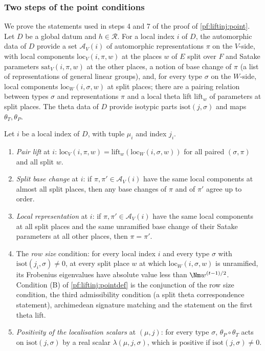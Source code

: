 \subsubsection{Two steps of the point conditions}\label{sec:pf:liftinj:ptsteps}

We prove the statements used in steps 4 and 7 of the proof of \cref{pf:liftinj:point}. Let $D$ be a global datum and $h\in\mathcal R$. For a local index
$i$ of $D$, the automorphic data of $D$ provide a set $\mathcal A_V(i)$ of automorphic representations $\pi$ on the $V$-side, with local components
$\mathrm{loc}_V(i,\pi,w)$ at the places $w$ of $E$ split over $F$ and Satake parameters $\mathrm{sat}_V(i,\pi,w)$ at the other places, a notion of base
change of $\pi$ (a list of representations of general linear groups), and, for every type $\sigma$ on the $W$-side, local components
$\mathrm{loc}_W(i,\sigma,w)$ at split places; there are a pairing relation between types $\sigma$ and representations $\pi$ and a local theta lift
$\mathrm{lift}_w$ of parameters at split places. The theta data of $D$ provide isotypic parts $\mathrm{isot}(j,\sigma)$ and maps $\theta_T,\theta_P$.

\begin{definition}\label{pf:liftinj:rowdef}
Let $i$ be a local index of $D$, with tuple $\mu_i$ and index $j_i$.
\begin{enumerate}[label=(\alph*)]
\item \emph{Pair lift} at $i$: $\mathrm{loc}_V(i,\pi,w)=\mathrm{lift}_w(\mathrm{loc}_W(i,\sigma,w))$ for all paired $(\sigma,\pi)$ and all split $w$.
\item \emph{Split base change} at $i$: if $\pi,\pi'\in\mathcal A_V(i)$ have the same local components at almost all split places, then any base changes of
$\pi$ and of $\pi'$ agree up to order.
\item \emph{Local representation} at $i$: if $\pi,\pi'\in\mathcal A_V(i)$ have the same local components at all split places and the same unramified base
change of their Satake parameters at all other places, then $\pi=\pi'$.
\item The \emph{row size} condition: for every local index $i$ and every type $\sigma$ with $\mathrm{isot}(j_i,\sigma)\ne0$, at every split place $w$ at which
$\mathrm{loc}_W(i,\sigma,w)$ is unramified, its Frobenius eigenvalues have absolute value less than $\Nm w^{(t-1)/2}$. Condition (B) of
\cref{pf:liftinj:pointdef} is the conjunction of the row size condition, the third admissibility condition (a split theta correspondence statement),
archimedean signature matching and the statement on the first theta lift.
\item \emph{Positivity of the localisation scalars} at $(\mu,j)$: for every type $\sigma$, $\theta_P\circ\theta_T$ acts on $\mathrm{isot}(j,\sigma)$ by a real
scalar $\lambda(\mu,j,\sigma)$, which is positive if $\mathrm{isot}(j,\sigma)\ne0$.
\end{enumerate}
\end{definition}

